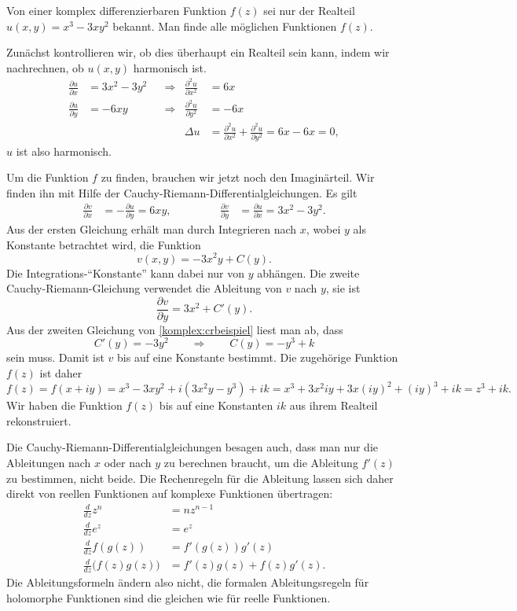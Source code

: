 \begin{beispiel}
Von einer komplex differenzierbaren Funktion $f(z)$ sei nur der Realteil
$u(x,y)=x^3 -3xy^2$ bekannt.
Man finde alle möglichen Funktionen $f(z)$.

Zunächst kontrollieren wir, ob dies überhaupt ein Realteil sein kann,
indem wir nachrechnen, ob $u(x,y)$ harmonisch ist.
\begin{equation*}
\begin{aligned}
\frac{\partial u}{\partial x}
&=
3x^2-3y^2
&&\Rightarrow&
\frac{\partial^2 u}{\partial x^2}
&=
6x
\\
\frac{\partial u}{\partial y}
&=
-6xy
&&\Rightarrow&
\frac{\partial^2 u}{\partial y^2}
&=
-6x
\\
&&&&\Delta u&=\frac{\partial^2u}{\partial x^2}+\frac{\partial^2u}{\partial y^2}=6x-6x=0,
\end{aligned}
\end{equation*}
$u$ ist also harmonisch.

Um die Funktion $f$ zu finden, brauchen wir jetzt noch den Imaginärteil.
Wir finden ihn mit Hilfe der Cauchy-Riemann-Differentialgleichungen.
Es gilt
\begin{equation}
\begin{aligned}
\frac{\partial v}{\partial x}
&=
-\frac{\partial u}{\partial y}=6xy,
&&\qquad
&
\frac{\partial v}{\partial y}
&=
\frac{\partial u}{\partial x}=3x^2-3y^2.
\end{aligned}
\label{komplex:crbeispiel}
\end{equation}
Aus der ersten Gleichung erhält man durch Integrieren nach $x$, wobei
$y$ als Konstante betrachtet wird, die Funktion
\[
v(x,y)=-3x^2y + C(y).
\]
Die Integrations-``Konstante'' kann dabei nur von $y$ abhängen.
Die zweite Cauchy-Riemann-Gleichung verwendet die Ableitung von $v$ nach $y$,
sie ist
\[
\frac{\partial v}{\partial y}=3x^2+C'(y).
\]
Aus der zweiten Gleichung von \eqref{komplex:crbeispiel} liest man
ab, dass
\[
C'(y)=-3y^2
\qquad\Rightarrow\qquad
C(y)=-y^3+k
\]
sein muss.
Damit ist $v$ bis auf eine Konstante bestimmt.
Die zugehörige Funktion $f(z)$ ist daher
\[
f(z)=f(x+iy)=x^3-3xy^2+i(3x^2y-y^3)+ik
=x^3 + 3x^2iy + 3x(iy)^2+(iy)^3+ik=z^3+ik.
\]
Wir haben die Funktion $f(z)$ bis auf eine Konstanten $ik$
aus ihrem Realteil rekonstruiert.
\end{beispiel}
Die Cauchy-Riemann-Differentialgleichungen besagen auch, dass man nur
die Ableitungen nach $x$ oder nach $y$ zu berechnen braucht,
um die Ableitung $f'(z)$ zu bestimmen, nicht beide.
Die Rechenregeln für die Ableitung lassen sich daher direkt von
reellen Funktionen auf komplexe Funktionen übertragen:
\begin{align*}
\frac{d}{dz}z^n
&=
nz^{n-1}
\\
\frac{d}{dz}e^z
&=
e^z
\\
\frac{d}{dz}f(g(z))
&=
f'(g(z)) g'(z)
\\
\frac{d}{dz}\bigl(f(z)g(z)\bigr)
&=
f'(z)g(z)+f(z)g'(z).
\end{align*}
Die Ableitungsformeln ändern also nicht, die formalen Ableitungsregeln
für holomorphe Funktionen sind die gleichen wie für reelle Funktionen.



